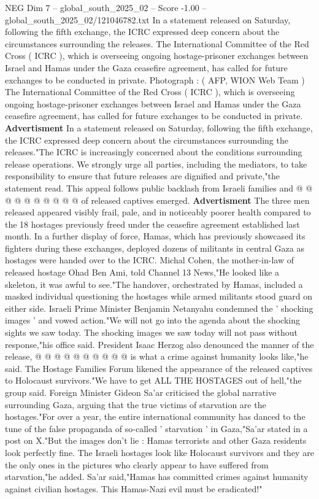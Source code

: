 \begin{textsample}{NEG Dim 7 – global\_south\_2025\_02 – Score -1.00 – global\_south\_2025\_02/121046782.txt}  \label{ex:f7_neg_032}
In a statement released on Saturday, following the fifth exchange, the ICRC expressed deep concern about the circumstances surrounding the releases.
The International Committee of the Red Cross ( ICRC ), which is overseeing ongoing hostage-prisoner exchanges between Israel and Hamas under the Gaza ceasefire agreement, has called for future exchanges to be conducted in private.
Photograph : ( AFP, WION Web Team ) The International Committee of the Red Cross ( ICRC ), which is overseeing ongoing hostage-prisoner exchanges between Israel and Hamas under the Gaza ceasefire agreement, has called for future exchanges to be conducted in private. \textbf{Advertisment} In a statement released on Saturday, following the fifth exchange, the ICRC expressed deep concern about the circumstances surrounding the releases."The ICRC is increasingly concerned about the conditions surrounding release operations.
We strongly urge all parties, including the mediators, to take responsibility to ensure that future releases are dignified and private,"the statement read.
This appeal follows public backlash from Israeli families and @ @ @ @ @ @ @ @ @ @ of released captives emerged. \textbf{Advertisment} The three men released appeared visibly frail, pale, and in noticeably poorer health compared to the 18 hostages previously freed under the ceasefire agreement established last month.
In a further display of force, Hamas, which has previously showcased its fighters during these exchanges, deployed dozens of militants in central Gaza as hostages were handed over to the ICRC.
Michal Cohen, the mother-in-law of released hostage Ohad Ben Ami, told Channel 13 News,"He looked like a skeleton, it was awful to see."The handover, orchestrated by Hamas, included a masked individual questioning the hostages while armed militants stood guard on either side.
Israeli Prime Minister Benjamin Netanyahu condemned the ' shocking images ' and vowed action."We will not go into the agenda about the shocking sights we saw today.
The shocking images we saw today will not pass without response,"his office said.
President Isaac Herzog also denounced the manner of the release, @ @ @ @ @ @ @ @ @ @ is what a crime against humanity looks like,"he said.
The Hostage Families Forum likened the appearance of the released captives to Holocaust survivors."We have to get ALL THE HOSTAGES out of hell,"the group said.
Foreign Minister Gideon Sa'ar criticised the global narrative surrounding Gaza, arguing that the true victims of starvation are the hostages."For over a year, the entire international community has danced to the tune of the false propaganda of so-called ' starvation ' in Gaza,"Sa'ar stated in a post on X."But the images don't lie : Hamas terrorists and other Gaza residents look perfectly fine.
The Israeli hostages look like Holocaust survivors and they are the only ones in the pictures who clearly appear to have suffered from starvation,"he added.
Sa'ar said,"Hamas has committed crimes against humanity against civilian hostages.
This Hamas-Nazi evil must be eradicated!"

\end{textsample}
